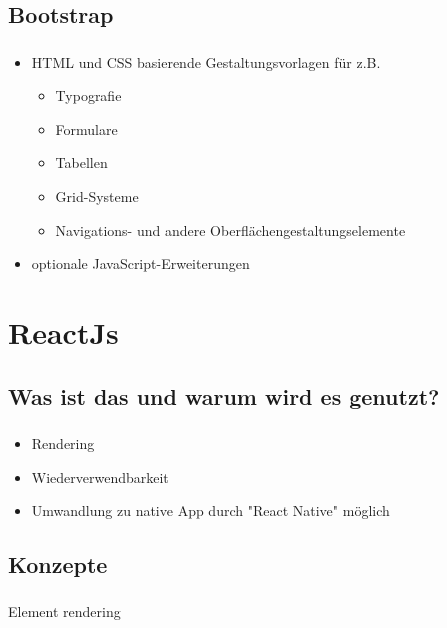 \documentclass[aspectratio=169,14pt,xcolor=dvipsnames]{beamer}
\begin{document}
\subsection{Bootstrap}
\begin{frame}[t]
    \frametitle{\subsecname}
    \framesubtitle{\secname}
    \begin{itemize}
        \setlength{\itemsep}{1.5em}
        \item HTML und CSS basierende Gestaltungsvorlagen für z.B.
        \begin{itemize}
            \setlength{\itemsep}{1em}
            \item Typografie
            \item Formulare
            \item Tabellen
            \item Grid-Systeme
            \item Navigations- und andere Oberflächengestaltungselemente
        \end{itemize}
        \item optionale JavaScript-Erweiterungen
    \end{itemize}
\end{frame}

\section{ReactJs}
\subsection{Was ist das und warum wird es genutzt?}
\begin{frame}[t]
    \frametitle{\subsecname}
    \framesubtitle{\secname}
    \begin{itemize}
        \setlength{\itemsep}{1.5em}
        \item Rendering
        \item Wiederverwendbarkeit
        \item Umwandlung zu native App durch "React Native" möglich
    \end{itemize}
\end{frame}

\subsection{Konzepte}
\begin{frame}[t]
    \frametitle{\subsecname}
    \framesubtitle{\secname}
    Element rendering
    
\end{frame}
\end{document}
